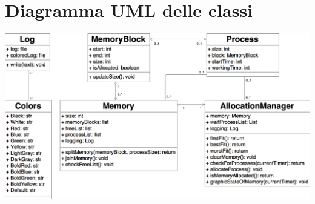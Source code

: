 \documentclass[20pt,a4paper,oneside]{article}
\begin{document}
\section{Diagramma UML delle classi}
\includegraphics[scale=0.26]{ClassDiagram.png}

\newpage
\end{document}
